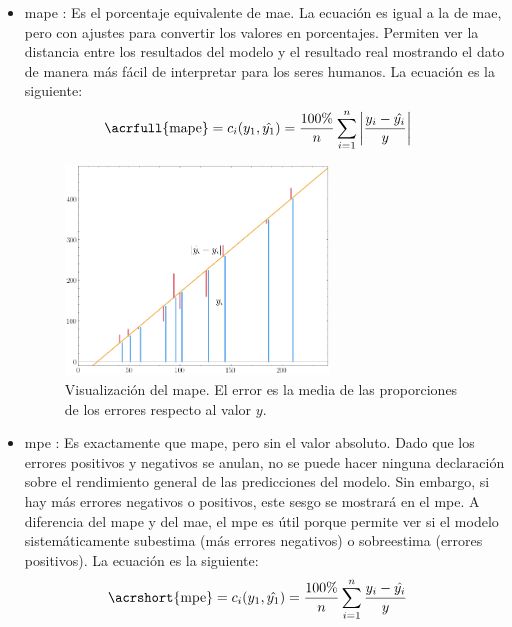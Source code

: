 \begin{itemize}
\item \acrfull{mape} \cite{errors_basics} \label{MAPE_loss}: Es el porcentaje equivalente de \acrshort{mae}. La ecuación es igual a la de \acrshort{mae}, pero con ajustes para convertir los valores en porcentajes. Permiten ver la distancia entre los resultados del modelo y el resultado real mostrando el dato de manera más fácil de interpretar para los seres humanos. La ecuación es la siguiente:
\begin{equation}
\centering
    \begin{split}
        \text{\acrfull{mape}} = c_i(y_1, \hat{y_1}) &= \frac{100\%}{n} \sum_{i=1}^n \left|\frac{y_i-\hat{y_i}}{y}\right|
    \end{split}
\end{equation}

\begin{figure}[H]
    \centering
    \includegraphics[width=7cm]{images/state-of-art/cost-function/mape.png}
    \caption{Visualización del \acrshort{mape}. El error es la media de las proporciones de los errores respecto al valor $y$.}
    \label{fig:error_mae}
\end{figure}

\item \acrfull{mpe} \cite{errors_basics} \label{MPE_loss}: Es exactamente que \acrshort{mape}, pero sin el valor absoluto. Dado que los errores positivos y negativos se anulan, no se puede hacer ninguna declaración sobre el rendimiento general de las predicciones del modelo. Sin embargo, si hay más errores negativos o positivos, este sesgo se mostrará en el \acrshort{mpe}. A diferencia del \acrshort{mape} y del \acrshort{mae}, el \acrshort{mpe} es útil porque permite ver si el modelo sistemáticamente subestima (más errores negativos) o sobreestima (errores positivos). La ecuación es la siguiente:
\begin{equation}
\centering
    \begin{split}
        \text{\acrshort{mpe}} = c_i(y_1, \hat{y_1}) &= \frac{100\%}{n} \sum_{i=1}^n \frac{y_i-\hat{y_i}}{y}
    \end{split}
\end{equation}


\end{itemize}
